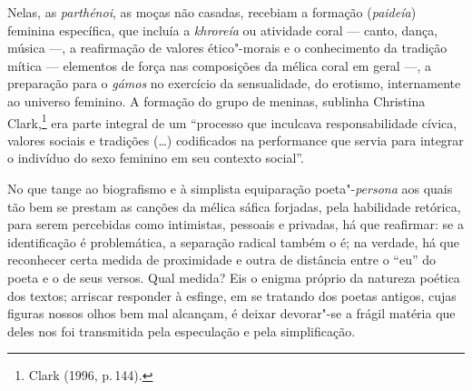 Nelas, as \textit{parthénoi}, as moças não casadas, recebiam a formação (\textit{paideía}) feminina específica, que incluía a \textit{khroreía} ou atividade coral --- canto, dança, música ---, a reafirmação de valores ético"-morais e o conhecimento da tradição mítica --- elementos de força nas composições da mélica coral em geral ---, a preparação para o \textit{gámos} no exercício da sensualidade, do erotismo, internamente ao universo feminino. A formação do grupo de meninas, sublinha Christina Clark,\footnote{Clark (1996, p.\,144).} era parte integral de um “processo que inculcava responsabilidade cívica, valores sociais e tradições (\ldots{}) codificados na performance que servia para integrar o indivíduo do sexo feminino em seu contexto social”.


No que tange ao biografismo e à simplista equiparação poeta"-\textit{persona} aos quais tão bem se prestam as canções da mélica sáfica forjadas, pela habilidade retórica, para serem percebidas como intimistas, pessoais e privadas, há que reafirmar: se a identificação é problemática,
a separação radical também o é; na verdade, há que reconhecer certa medida de
proximidade e outra de distância entre o “eu” do poeta e o de seus versos. Qual
medida? Eis o enigma próprio da natureza poética dos textos; arriscar
responder à esfinge, em se tratando dos poetas antigos, cujas figuras nossos
olhos bem mal alcançam, é deixar devorar"-se a frágil matéria que deles nos foi
transmitida pela especulação e pela simplificação.


